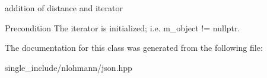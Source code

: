 addition of distance and iterator 

\begin{DoxyPrecond}{Precondition}
The iterator is initialized; i.\+e. {\ttfamily m\+\_\+object != nullptr}. 
\end{DoxyPrecond}


The documentation for this class was generated from the following file\+:\begin{DoxyCompactItemize}
\item 
single\+\_\+include/nlohmann/json.\+hpp\end{DoxyCompactItemize}
